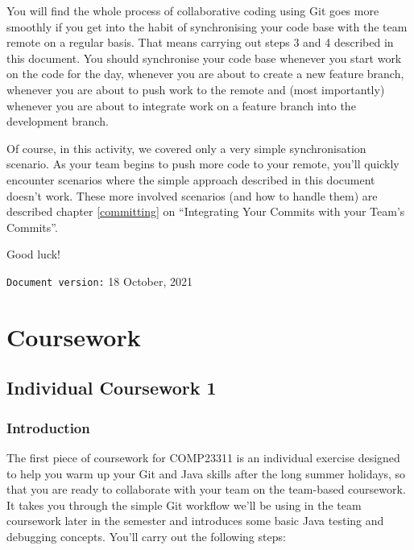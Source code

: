 \documentclass[
]{book}
\begin{document}
You will find the whole process of collaborative coding using Git goes more smoothly if you get into the habit of synchronising your code base with the team remote on a regular basis. That means carrying out steps 3 and 4 described in this document. You should synchronise your code base whenever you start work on the code for the day, whenever you are about to create a new feature branch, whenever you are about to push work to the remote and (most importantly) whenever you are about to integrate work on a feature branch into the development branch.

Of course, in this activity, we covered only a very simple synchronisation scenario. As your team begins to push more code to your remote, you'll quickly encounter scenarios where the simple approach described in this document doesn't work. These more involved scenarios (and how to handle them) are described chapter \ref{committing} on ``Integrating Your Commits with your Team's Commits''.

Good luck!

\texttt{Document\ version:} 18 October, 2021

\hypertarget{part-coursework}{%
\part{Coursework}\label{part-coursework}}

\hypertarget{gitting}{%
\chapter{Individual Coursework 1}\label{gitting}}

\hypertarget{introcw1}{%
\section{Introduction}\label{introcw1}}

The first piece of coursework for COMP23311 is an individual exercise designed to help you warm up your Git and Java skills after the long summer holidays, so that you are ready to collaborate with your team on the team-based coursework. It takes you through the simple Git workflow we'll be using in the team coursework later in the semester and introduces some basic Java testing and debugging concepts. You'll carry out the following steps:
\end{document}
